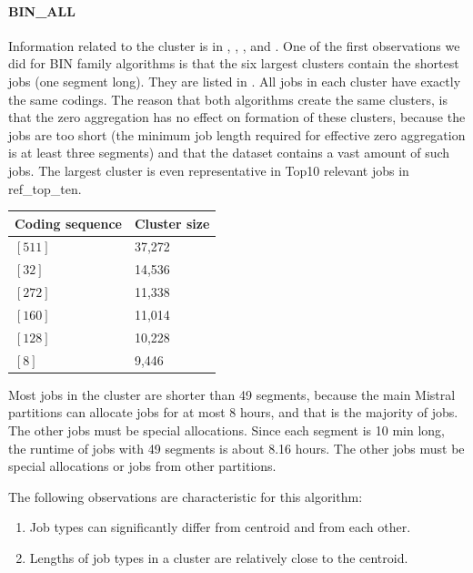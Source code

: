 \documentclass[]{llncs}
\begin{document}
\paragraph{BIN\_ALL}
Information related to the cluster is in , , , and .
One of the first observations we did for BIN family algorithms is that the six largest clusters contain the shortest jobs (one segment long).
They are listed in .
All jobs in each cluster have exactly the same codings.
The reason that both algorithms create the same clusters, is that the zero aggregation has no effect on formation of these clusters, because the jobs are too short (the minimum job length required for effective zero aggregation is at least three segments) and that the dataset contains a vast amount of such jobs.
The largest cluster is even representative in Top10 relevant jobs in ref\_top\_ten.

\begingroup
  \centering
  \begin{tabular}{ll}
    Coding sequence & Cluster size \\
    \hline
    $[511]$ & 37,272 \\
    $[32]$  & 14,536 \\
    $[272]$ & 11,338 \\
    $[160]$ & 11,014 \\
    $[128]$ & 10,228 \\
    $[8]$   & 9,446  \\
  \end{tabular}
  \label{tab:bin:largest_clusters}
\endgroup

Most jobs in the cluster are shorter than 49 segments, because the main Mistral partitions can allocate jobs for at most 8 hours, and that is the majority of jobs.
The other jobs must be special allocations.
Since each segment is 10 min long, the runtime of jobs with 49 segments is about 8.16 hours.
The other jobs must be special allocations or jobs from other partitions.

The following observations are characteristic for this algorithm:
\begin{enumerate}
 \item Job types can significantly differ from centroid and from each other.
 \item Lengths of job types in a cluster are relatively close to the centroid.
\end{enumerate}
\end{document}
